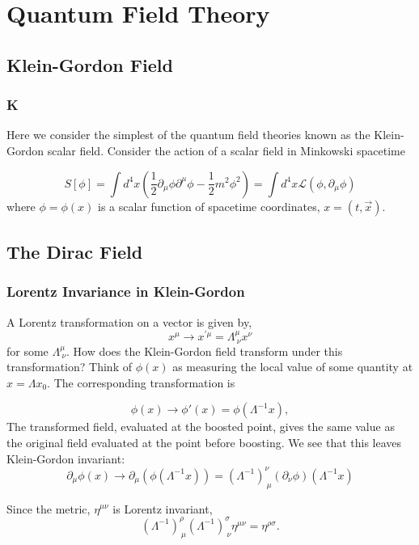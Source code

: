\chapter{Quantum Field Theory}
\section{Klein-Gordon Field}
\subsection{K}
Here we consider the simplest of the quantum field theories known as the Klein-Gordon scalar field. Consider the action of a scalar field in Minkowski spacetime

\begin{equation}
    S[\phi] = \int d^4x\left(\frac{1}{2}\partial_{\mu}\phi\partial^{\mu}\phi-\frac{1}{2}m^2\phi^2\right) = \int d^4x\mathcal{L}(\phi,\partial_{\mu}\phi)
\end{equation}
where $\phi=\phi(x)$ is a scalar function of spacetime coordinates, $x=(t,\vec{x})$. 

\section{The Dirac Field}
\subsection{Lorentz Invariance in Klein-Gordon}
A Lorentz transformation on a vector is given by,
\begin{equation}
    x^{\mu} \rightarrow x^{'\mu} = \Lambda^{\mu}_{\ \nu}x^{\nu} 
\end{equation}
for some $\Lambda^{\mu}_{\ \nu}$. How does the Klein-Gordon field transform under this transformation? Think of $\phi(x)$ as measuring the local value of some quantity at $x = \Lambda x_0$. The corresponding transformation is 

$$
\phi(x) \rightarrow \phi'(x) = \phi(\Lambda^{-1}x),
$$
The transformed field, evaluated at the boosted point, gives the same value as the original field evaluated at the point before boosting. We see that this leaves Klein-Gordon invariant: 
\begin{equation}
    \partial_{\mu}\phi(x)\rightarrow \partial_{\mu}(\phi(\Lambda^{-1}x)) = (\Lambda^{-1})^{\nu}_{\ \mu}(\partial_{\nu}\phi)(\Lambda^{-1}x)
\end{equation}

Since the metric, $\eta^{\mu\nu}$ is Lorentz invariant,
\begin{equation}
    (\Lambda^{-1})^{\rho}_{\ \mu}(\Lambda^{-1})^{\sigma}_{\ \nu}\eta^{\mu\nu} = \eta^{\rho\sigma}.
\end{equation}

